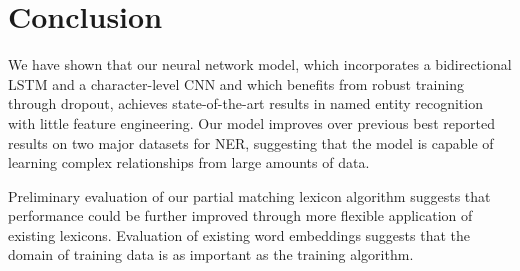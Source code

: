 \documentclass[11pt,letterpaper]{article}
\begin{document}

\section{Conclusion}

We have shown that our neural network model, which incorporates a bidirectional LSTM and a character-level CNN and which benefits from robust training through dropout, achieves state-of-the-art results in named entity recognition with little feature engineering. Our model improves over previous best reported results on two major datasets for NER, %
suggesting that the model is capable of learning complex relationships from large amounts of data.

Preliminary evaluation of our partial matching lexicon algorithm suggests that performance could be further improved through more flexible application of existing lexicons. Evaluation of existing word embeddings suggests that the domain of training data is as important as the training algorithm. 
\end{document}
